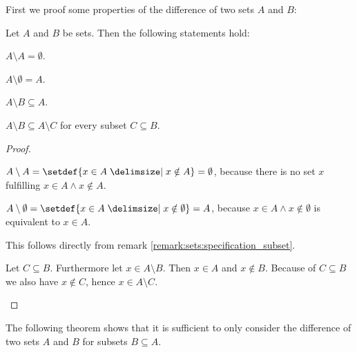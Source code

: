 First we proof some properties of the difference of two sets $A$ and $B$:

\begin{theorem}
    Let $A$ and $B$ be sets. Then the following statements hold:
    \begin{intheoremenumerate}
        \item\label{theorem:sets:difference_self} $A\setminus A=\emptyset$.
        \item\label{theorem:sets:difference_emptyset} $A\setminus \emptyset=A$.
        \item\label{theorem:sets:difference_subset} $A\setminus B\subseteq A$.
        \item\label{theorem:sets:difference_inclusion} $A\setminus B\subseteq A\setminus C$ for every subset $C\subseteq B$.
    \end{intheoremenumerate}
\end{theorem}

\begin{proof}
    \begin{proofenumerate}
        \item $A\setminus A=\setdef{x\in A\given x\notin A}=\emptyset$, because there is no set $x$ fulfilling $x\in A\land x\notin A$.
        \item $A\setminus\emptyset=\setdef{x\in A\given x\notin\emptyset}=A$, because $x\in A\land x\notin\emptyset$ is equivalent to $x\in A$.
        \item This follows directly from remark \ref{remark:sets:specification_subset}.
        \item Let $C\subseteq B$. Furthermore let $x\in A\setminus B$. Then $x\in A$ and $x\notin B$. Because of $C\subseteq B$ we also have $x\notin C$, hence $x\in A\setminus C$.
    \end{proofenumerate}
\end{proof}

The following theorem shows that it is sufficient to only consider the difference of two sets $A$ and $B$ for subsets $B\subseteq A$.

